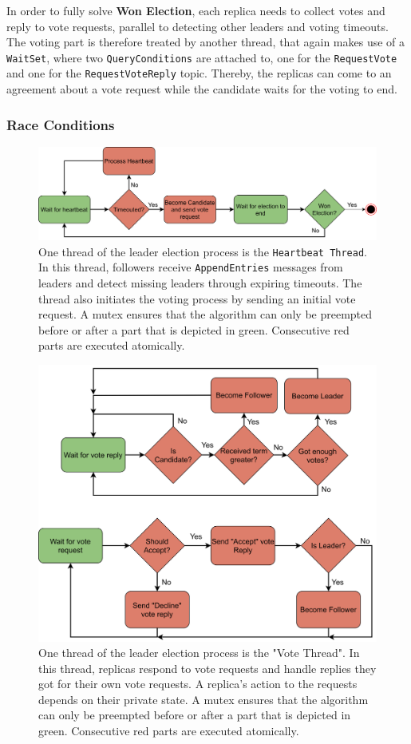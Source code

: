 In order to fully solve \textbf{Won Election}, each replica needs to collect votes and reply to vote requests, parallel to detecting other leaders and voting timeouts.
The voting part is therefore treated by another  thread, that again makes use of a \texttt{WaitSet}, where two \texttt{QueryConditions} are attached to, one for the \texttt{RequestVote} and one for the \texttt{RequestVoteReply} topic.
Thereby, the replicas can come to an agreement about a vote request while the candidate waits for the voting to end.

\subsubsection{Race Conditions}
\label{subsub:raceConditions}
\begin{figure}[!hb]
	\centering
	\includegraphics[width=0.75\linewidth]{images/LeaderElectionHeartbeatThread}
	\caption{One  thread of the leader election process is the \texttt{Heartbeat Thread}. In this thread, followers receive \texttt{AppendEntries} messages from leaders and detect missing leaders through expiring timeouts. The thread also initiates the voting process by sending an initial vote request. A mutex ensures that the algorithm can only be preempted before or after a part that is depicted in green. Consecutive red parts are executed atomically.}
	\label{fig:LeaderElectionHeartbeatThread}
\end{figure}

\begin{figure}[!hb]
	\centering
	\includegraphics[width=0.75\linewidth]{images/LeaderElectionVoteThread}
	\caption{One  thread of the leader election process is the "Vote Thread". In this thread, replicas respond to vote requests and handle replies they got for their own vote requests. A replica's action to the requests depends on their private state. A mutex ensures that the algorithm can only be preempted before or after a part that is depicted in green. Consecutive red parts are executed atomically.}
	\label{fig:LeaderElectionVoteThread}
\end{figure}

